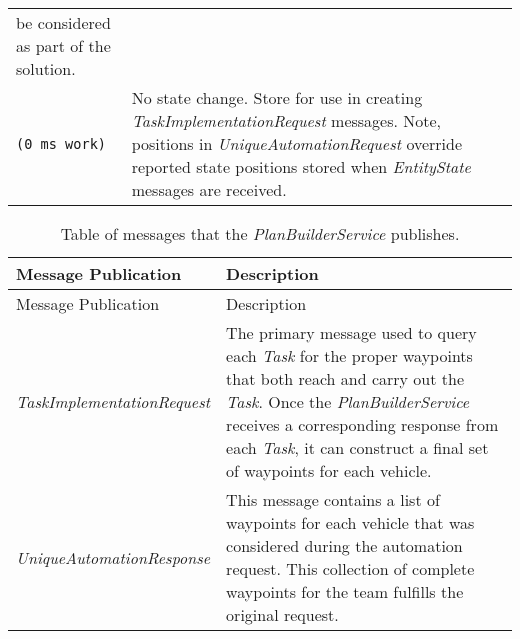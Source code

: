 \begin{longtable}[c]{@{}ll@{}}
\begin{minipage}[t]{0.65\columnwidth}
be considered as part of the solution.
\strut\end{minipage}\tabularnewline
\begin{minipage}[t]{0.29\columnwidth}\raggedright\strut
\begin{verbatim}
(0 ms work)
\end{verbatim}
\strut\end{minipage} &
\begin{minipage}[t]{0.65\columnwidth}\raggedright\strut
No state change. Store for use in creating
\emph{TaskImplementationRequest} messages. Note, positions in
\emph{UniqueAutomationRequest} override reported state positions stored
when \emph{EntityState} messages are received.
\strut\end{minipage}\tabularnewline
\bottomrule
\end{longtable}

\begin{longtable}[c]{@{}ll@{}}
\caption{Table of messages that the \emph{PlanBuilderService}
publishes.}\tabularnewline
\toprule
\begin{minipage}[b]{0.29\columnwidth}\raggedright\strut
Message Publication
\strut\end{minipage} &
\begin{minipage}[b]{0.65\columnwidth}\raggedright\strut
Description
\strut\end{minipage}\tabularnewline
\midrule
\endfirsthead
\toprule
\begin{minipage}[b]{0.29\columnwidth}\raggedright\strut
Message Publication
\strut\end{minipage} &
\begin{minipage}[b]{0.65\columnwidth}\raggedright\strut
Description
\strut\end{minipage}\tabularnewline
\midrule
\endhead
\begin{minipage}[t]{0.29\columnwidth}\raggedright\strut
\emph{TaskImplementationRequest}
\strut\end{minipage} &
\begin{minipage}[t]{0.65\columnwidth}\raggedright\strut
The primary message used to query each \emph{Task} for the proper
waypoints that both reach and carry out the \emph{Task}. Once the
\emph{PlanBuilderService} receives a corresponding response from each
\emph{Task}, it can construct a final set of waypoints for each vehicle.
\strut\end{minipage}\tabularnewline
\begin{minipage}[t]{0.29\columnwidth}\raggedright\strut
\emph{UniqueAutomationResponse}
\strut\end{minipage} &
\begin{minipage}[t]{0.65\columnwidth}\raggedright\strut
This message contains a list of waypoints for each vehicle that was
considered during the automation request. This collection of complete
waypoints for the team fulfills the original request.
\strut\end{minipage}\tabularnewline
\bottomrule
\end{longtable}
